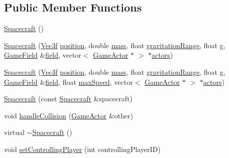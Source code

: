 \subsection*{Public Member Functions}
\begin{DoxyCompactItemize}
\item 
\hyperlink{class_spacecraft_a93c3e7d6d270c6efd9bec0f9229e688a}{Spacecraft} ()
\item 
\hyperlink{class_spacecraft_a1e1fbdad5696627f57c3b9bcfd078a2e}{Spacecraft} (\hyperlink{class_vec3f}{Vec3f} \hyperlink{class_game_actor_aefed3c91bf32ad388d86657b3bb9ddfa}{position}, double \hyperlink{class_game_actor_a2111233f4f0216db4d172d5088ebeed4}{mass}, float \hyperlink{class_game_actor_a9c0ba51b08a3e617d9629c0ee8d309f2}{gravitation\+Range}, float \hyperlink{class_game_actor_a42ed4bef0d99cf053ff9a025c86d34d3}{g}, \hyperlink{class_game_field}{Game\+Field} \&\hyperlink{class_game_actor_a0224fbc502abd6b7579787aa234332d5}{field}, vector$<$ \hyperlink{class_game_actor}{Game\+Actor} $\ast$ $>$ $\ast$\hyperlink{class_game_actor_a2405618d895f5143b42ae9e94d20e693}{actors})
\item 
\hyperlink{class_spacecraft_ad3d183c88aac7dc81ccde4fe1c11c607}{Spacecraft} (\hyperlink{class_vec3f}{Vec3f} \hyperlink{class_game_actor_aefed3c91bf32ad388d86657b3bb9ddfa}{position}, double \hyperlink{class_game_actor_a2111233f4f0216db4d172d5088ebeed4}{mass}, float \hyperlink{class_game_actor_a9c0ba51b08a3e617d9629c0ee8d309f2}{gravitation\+Range}, float \hyperlink{class_game_actor_a42ed4bef0d99cf053ff9a025c86d34d3}{g}, \hyperlink{class_game_field}{Game\+Field} \&\hyperlink{class_game_actor_a0224fbc502abd6b7579787aa234332d5}{field}, float \hyperlink{class_game_actor_a15b6abd006c52b21c569932f8b484eb0}{max\+Speed}, vector$<$ \hyperlink{class_game_actor}{Game\+Actor} $\ast$ $>$ $\ast$\hyperlink{class_game_actor_a2405618d895f5143b42ae9e94d20e693}{actors})
\item 
\hyperlink{class_spacecraft_aeb5ea1964f119583c0bccca819405ea1}{Spacecraft} (const \hyperlink{class_spacecraft}{Spacecraft} \&spacecraft)
\item 
void \hyperlink{class_spacecraft_a52608575fde91a502be1621b348884ec}{handle\+Collision} (\hyperlink{class_game_actor}{Game\+Actor} \&other)
\item 
virtual \hyperlink{class_spacecraft_ac0e87c9c8fae261371f401895e428f96}{$\sim$\+Spacecraft} ()
\item 
void \hyperlink{class_spacecraft_aba6f42e402bf71b69e1b750a20fc567f}{set\+Controlling\+Player} (int controlling\+Player\+I\+D)

\end{DoxyCompactItemize}
